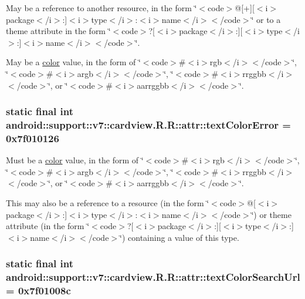 May be a reference to another resource, in the form \char`\"{}$<$code$>$@\mbox{[}+\mbox{]}\mbox{[}$<$i$>$package$<$/i$>$:\mbox{]}$<$i$>$type$<$/i$>$:$<$i$>$name$<$/i$>$$<$/code$>$\char`\"{} or to a theme attribute in the form \char`\"{}$<$code$>$?\mbox{[}$<$i$>$package$<$/i$>$:\mbox{]}\mbox{[}$<$i$>$type$<$/i$>$:\mbox{]}$<$i$>$name$<$/i$>$$<$/code$>$\char`\"{}. 

May be a \hyperlink{classandroid_1_1support_1_1v7_1_1cardview_1_1_r_1_1color}{color} value, in the form of \char`\"{}$<$code$>$\#$<$i$>$rgb$<$/i$>$$<$/code$>$\char`\"{}, \char`\"{}$<$code$>$\#$<$i$>$argb$<$/i$>$$<$/code$>$\char`\"{}, \char`\"{}$<$code$>$\#$<$i$>$rrggbb$<$/i$>$$<$/code$>$\char`\"{}, or \char`\"{}$<$code$>$\#$<$i$>$aarrggbb$<$/i$>$$<$/code$>$\char`\"{}. \hypertarget{classandroid_1_1support_1_1v7_1_1cardview_1_1_r_1_1attr_b2f9130d3f5c81f6a03f27ae693c86d4}{
\subsubsection[{textColorError}]{\setlength{\rightskip}{0pt plus 5cm}static final int android::support::v7::cardview.R.R::attr::textColorError = 0x7f010126}}
\label{classandroid_1_1support_1_1v7_1_1cardview_1_1_r_1_1attr_b2f9130d3f5c81f6a03f27ae693c86d4}


Must be a \hyperlink{classandroid_1_1support_1_1v7_1_1cardview_1_1_r_1_1color}{color} value, in the form of \char`\"{}$<$code$>$\#$<$i$>$rgb$<$/i$>$$<$/code$>$\char`\"{}, \char`\"{}$<$code$>$\#$<$i$>$argb$<$/i$>$$<$/code$>$\char`\"{}, \char`\"{}$<$code$>$\#$<$i$>$rrggbb$<$/i$>$$<$/code$>$\char`\"{}, or \char`\"{}$<$code$>$\#$<$i$>$aarrggbb$<$/i$>$$<$/code$>$\char`\"{}. 

This may also be a reference to a resource (in the form \char`\"{}$<$code$>$@\mbox{[}$<$i$>$package$<$/i$>$:\mbox{]}$<$i$>$type$<$/i$>$:$<$i$>$name$<$/i$>$$<$/code$>$\char`\"{}) or theme attribute (in the form \char`\"{}$<$code$>$?\mbox{[}$<$i$>$package$<$/i$>$:\mbox{]}\mbox{[}$<$i$>$type$<$/i$>$:\mbox{]}$<$i$>$name$<$/i$>$$<$/code$>$\char`\"{}) containing a value of this type. \hypertarget{classandroid_1_1support_1_1v7_1_1cardview_1_1_r_1_1attr_dd00aa364d815766f3bfa412d4a23b5e}{
\subsubsection[{textColorSearchUrl}]{\setlength{\rightskip}{0pt plus 5cm}static final int android::support::v7::cardview.R.R::attr::textColorSearchUrl = 0x7f01008c}}
\label{classandroid_1_1support_1_1v7_1_1cardview_1_1_r_1_1attr_dd00aa364d815766f3bfa412d4a23b5e}



